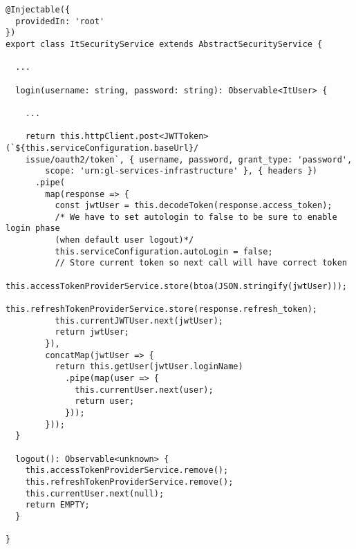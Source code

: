 \begin{lstlisting}[caption={Principali metodi della classe ItSecurityService}, style=javaScriptCode]
@Injectable({
  providedIn: 'root'
})
export class ItSecurityService extends AbstractSecurityService {

  ...

  login(username: string, password: string): Observable<ItUser> {
  
    ...
    
    return this.httpClient.post<JWTToken>(`${this.serviceConfiguration.baseUrl}/
    issue/oauth2/token`, { username, password, grant_type: 'password', 
        scope: 'urn:gl-services-infrastructure' }, { headers })
      .pipe(
        map(response => {
          const jwtUser = this.decodeToken(response.access_token);
          /* We have to set autologin to false to be sure to enable login phase 
          (when default user logout)*/
          this.serviceConfiguration.autoLogin = false;
          // Store current token so next call will have correct token
          this.accessTokenProviderService.store(btoa(JSON.stringify(jwtUser)));
          this.refreshTokenProviderService.store(response.refresh_token);
          this.currentJWTUser.next(jwtUser);
          return jwtUser;
        }),
        concatMap(jwtUser => {
          return this.getUser(jwtUser.loginName)
            .pipe(map(user => {
              this.currentUser.next(user);
              return user;
            }));
        }));
  }

  logout(): Observable<unknown> {
    this.accessTokenProviderService.remove();
    this.refreshTokenProviderService.remove();
    this.currentUser.next(null);
    return EMPTY;
  }

}
\end{lstlisting}
